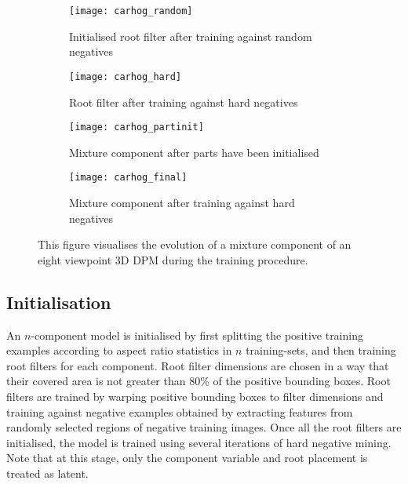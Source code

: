 \begin{figure}[]
\begin{center}
        \begin{subfigure}[b]{0.45\textwidth}
                \texttt{[image: carhog\_random]}
                \caption{Initialised root filter after training against random negatives}
                \label{fig:carhog_random}
        \end{subfigure}
        \begin{subfigure}[b]{0.45\textwidth}
               \texttt{[image: carhog\_hard]}
               \caption{Root filter after training against hard negatives}
                \label{fig:carhog_hard}
        \end{subfigure}
        \begin{subfigure}[b]{0.45\textwidth}
               \texttt{[image: carhog\_partinit]}
               \caption{Mixture component after parts have been initialised}
                \label{fig:carhog_partinit}
        \end{subfigure}
        \begin{subfigure}[b]{0.45\textwidth}
               \texttt{[image: carhog\_final]}
               \caption{Mixture component after training against hard negatives}
                \label{fig:carhog_final}
        \end{subfigure}
\caption{This figure visualises the evolution of a mixture component of an eight viewpoint 3D DPM during the training procedure.}
\label{fig:carhog}
\end{center}
\end{figure}

\subsection{Initialisation}
An $n$-component model is initialised by first splitting the positive training examples according to aspect ratio statistics in $n$ training-sets,  and then training root filters for each component. Root filter dimensions are chosen in a way that their covered area is not greater than 80\% of the positive bounding boxes. Root filters are trained by warping positive bounding boxes to filter dimensions and training against negative examples obtained by extracting features from randomly selected regions of negative training images. Once all the root filters are initialised, the model is trained using several iterations of hard negative mining. Note that at this stage, only the component variable and root placement is treated as latent. 

